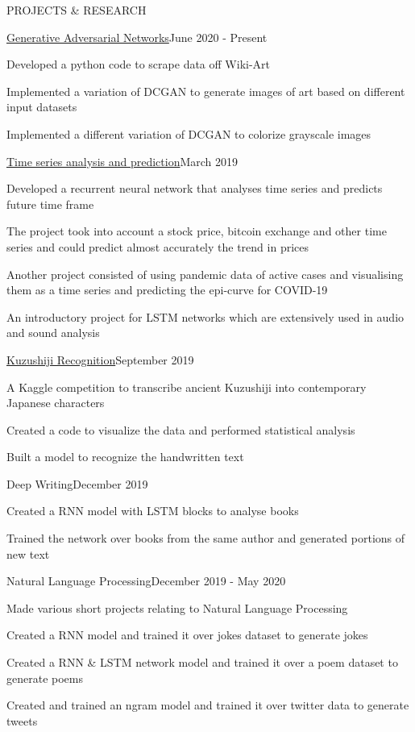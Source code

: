 \documentclass{resume} %
\begin{document}
\begin{rSection}{PROJECTS \& RESEARCH}
\begin{rSubsection}{\href{https://github.com/obi-wan-shinobi/Modern-Art}{Generative Adversarial Networks}}{June 2020 - Present}{}{}
\item Developed a python code to scrape data off Wiki-Art
\item Implemented a variation of DCGAN to generate images of art based on different input datasets
\item Implemented a different variation of DCGAN to colorize grayscale  images
\end{rSubsection}

\begin{rSubsection}{\href{https://github.com/obi-wan-shinobi/BTC_predictor}{Time series analysis and prediction}}{March 2019}{}{}
\item Developed a recurrent neural network that analyses time series and predicts future time frame
\item The project took into account a stock price, bitcoin exchange and other time series and could predict almost accurately the trend in prices
\item Another project consisted of using pandemic data of active cases and visualising them as a time series and predicting the epi-curve for COVID-19
\item An introductory project for LSTM networks which are extensively used in audio and sound analysis
\end{rSubsection}

\begin{rSubsection}{\href{https://github.com/obi-wan-shinobi/kuzushiji}{Kuzushiji Recognition}}{September 2019}{}{}
\item A Kaggle competition to transcribe ancient Kuzushiji into contemporary Japanese characters
\item Created a code to visualize the data and performed statistical analysis
\item Built a model to recognize the handwritten text
\end{rSubsection}

\begin{rSubsection}{Deep Writing}{December 2019}{}{}
\item Created a RNN model with LSTM blocks to analyse books
\item Trained the network over books from the same author and generated portions of new text
\end{rSubsection}

\begin{rSubsection}{Natural Language Processing}{December 2019 - May 2020}{}{}
\item Made various short projects relating to Natural Language Processing
\item Created a RNN model and trained it over jokes dataset to generate jokes
\item Created a RNN \& LSTM network model and trained it over a poem dataset to generate poems
\item Created and trained an ngram model and trained it over twitter data to generate tweets
\end{rSubsection}


\end{rSection}
\end{document}
